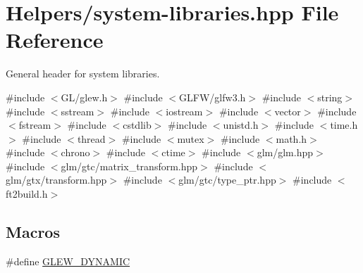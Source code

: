 \hypertarget{system-libraries_8hpp}{}\section{Helpers/system-\/libraries.hpp File Reference}
\label{system-libraries_8hpp}


General header for system libraries.  


{\ttfamily \#include $<$G\+L/glew.\+h$>$}\newline
{\ttfamily \#include $<$G\+L\+F\+W/glfw3.\+h$>$}\newline
{\ttfamily \#include $<$string$>$}\newline
{\ttfamily \#include $<$sstream$>$}\newline
{\ttfamily \#include $<$iostream$>$}\newline
{\ttfamily \#include $<$vector$>$}\newline
{\ttfamily \#include $<$fstream$>$}\newline
{\ttfamily \#include $<$cstdlib$>$}\newline
{\ttfamily \#include $<$unistd.\+h$>$}\newline
{\ttfamily \#include $<$time.\+h$>$}\newline
{\ttfamily \#include $<$thread$>$}\newline
{\ttfamily \#include $<$mutex$>$}\newline
{\ttfamily \#include $<$math.\+h$>$}\newline
{\ttfamily \#include $<$chrono$>$}\newline
{\ttfamily \#include $<$ctime$>$}\newline
{\ttfamily \#include $<$glm/glm.\+hpp$>$}\newline
{\ttfamily \#include $<$glm/gtc/matrix\+\_\+transform.\+hpp$>$}\newline
{\ttfamily \#include $<$glm/gtx/transform.\+hpp$>$}\newline
{\ttfamily \#include $<$glm/gtc/type\+\_\+ptr.\+hpp$>$}\newline
{\ttfamily \#include $<$ft2build.\+h$>$}\newline
\subsection*{Macros}
\begin{DoxyCompactItemize}
\item 
\#define \mbox{\hyperlink{system-libraries_8hpp_a1df29b21e01c0880c00e4dca1cd34a20}{G\+L\+E\+W\+\_\+\+D\+Y\+N\+A\+M\+IC}}
\end{DoxyCompactItemize}


